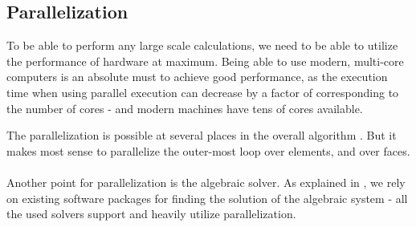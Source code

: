\subsection{Parallelization}
\label{section:parallel}
To be able to perform any large scale calculations, we need to be able to utilize the performance of hardware at maximum. Being able to use modern, multi-core computers is an absolute must to achieve good performance, as the execution time when using parallel execution can decrease by a factor of corresponding to the number of cores - and modern machines have tens of cores available.

The parallelization is possible at several places in the overall algorithm . But it makes most sense to parallelize the outer-most loop over elements, and over faces.

\paragraph{}
Another point for parallelization is the algebraic solver. As explained in , we rely on existing software packages for finding the solution of the algebraic system  - all the used solvers support and heavily utilize parallelization.